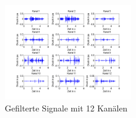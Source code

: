\documentclass[conference]{IEEEtran}
\begin{document}
\begin{figure}[h]
	\vspace{-5pt}
	\centering
	\includegraphics[width=0.5\textwidth]{img/fb_12.png}
	\vspace{-20pt}
	\caption{Gefilterte Signale mit 12 Kanälen}
	\vspace{-20pt}
	\label{fig:fb-12}
\end{figure}
\end{document}
